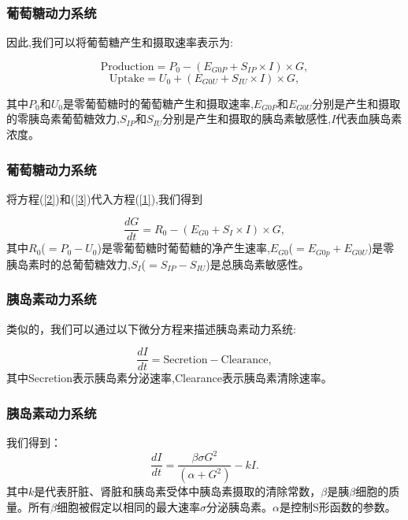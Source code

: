 \documentclass{beamer}
\begin{document}
\begin{frame}
    \frametitle{葡萄糖动力系统}
    因此,我们可以将葡萄糖产生和摄取速率表示为\cite{best1981glucose}:

\begin{equation}\label{2}
    \text{Production} = P_0 -(E_{G0P} + S_{IP} \times I) \times G,
\end{equation}
\begin{equation}\label{3}
    \text{Uptake} = U_0 + (E_{G0U} + S_{IU} \times I) \times G,
\end{equation}

其中$P_0$和$U_0$是零葡萄糖时的葡萄糖产生和摄取速率,\(E_{G0P}\)和\(E_{G0U}\)分别是产生和摄取的零胰岛素葡萄糖效力,\(S_{IP}\)和\(S_{IU}\)分别是产生和摄取的胰岛素敏感性,$I$代表血胰岛素浓度。
    

\end{frame}

\begin{frame}
    \frametitle{葡萄糖动力系统}
    将方程(\ref{2})和(\ref{3})代入方程(\ref{1}),我们得到

\begin{equation}
    \frac{dG}{dt} = R_0 -(E_{G0} + S_I \times I) \times G,
\end{equation}
其中$R_0$($=P_0-U_0$)是零葡萄糖时葡萄糖的净产生速率,\(E_{G0}\)($=E_{G0p}+E_{G0U}$)是零胰岛素时的总葡萄糖效力,\(S_I\)($=S_{IP}-S_{IU}$)是总胰岛素敏感性。
\end{frame}

\begin{frame}
    \frametitle{胰岛素动力系统}
    类似的，我们可以通过以下微分方程来描述胰岛素动力系统:

    \begin{equation}\label{4}
        \frac{dI}{dt} = \text{Secretion} - \text{Clearance},
    \end{equation}
    其中Secretion表示胰岛素分泌速率,Clearance表示胰岛素清除速率。
    

\end{frame}

\begin{frame}
    \frametitle{胰岛素动力系统}
    我们得到：
    \begin{equation}
        \frac{dI}{dt} = \frac{\beta\sigma G^2}{(\alpha + G^2)} - kI.
    \end{equation}
    其中$k$是代表肝脏、肾脏和胰岛素受体中胰岛素摄取的清除常数，$\beta$是胰$\beta$细胞的质量。所有$\beta$细胞被假定以相同的最大速率$\sigma$分泌胰岛素。$\alpha$是控制S形函数的参数\cite{topp2000model}。  

\end{frame}
\end{document}
